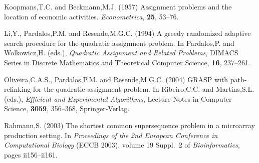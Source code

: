 \documentclass[english]{lni}
\begin{document}
\begin{thebibliography}{9}
 Koopmans,T.C. and
Beckmann,M.J. (1957) Assignment problems and the location of economic
activities. {\it Econometrica}, {\bf 25}, 53--76.

 Li,Y., Pardalos,P.M. and Resende,M.G.C.
(1994) A greedy randomized adaptive search procedure for the quadratic
assignment problem. In Pardalos,P. and Wolkowicz,H. (eds.), {\it Quadratic
Assignment and Related Problems}, DIMACS Series in Discrete Mathematics and
Theoretical Computer Science, {\bf 16}, 237--261.

 Oliveira,C.A.S., Pardalos,P.M.
and Resende,M.G.C. (2004) GRASP with path-relinking for the quadratic assignment
problem. In Ribeiro,C.C. and Martins,S.L. (eds.), {\it Efficient and
Experimental Algorithms}, Lecture Notes in Computer Science, {\bf 3059},
356--368, Springer-Verlag.

Rahmann,S. (2003) The shortest common supersequence problem in a microarray
production setting. In {\it Proceedings of the 2nd European Conference in
Computational Biology} ({ECCB} 2003), volume 19 Suppl.~2 of
{\it Bioinformatics}, pages ii156--ii161.

\end{thebibliography}
\end{document}
